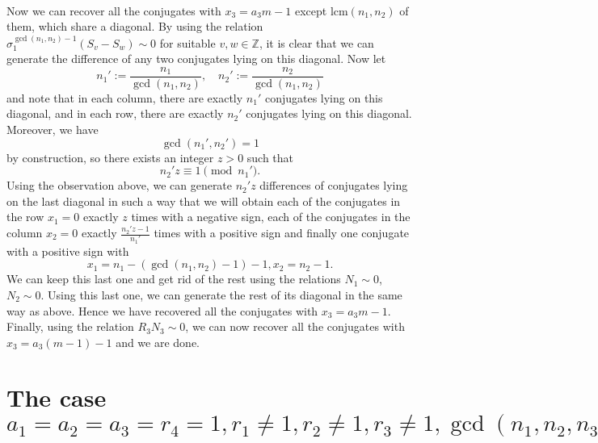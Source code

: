 \documentclass[12pt,a4paper]{article}
\theoremstyle{definition}
\newcommand{\Z}{\mathbb{Z}}
\newcommand{\lcm}{\mathrm{lcm}}
\begin{document}
\paragraph*{}
Now we can recover all the conjugates with $x_3=a_3m-1$ except $\lcm(n_1,n_2)$ of them, which share a diagonal. By using the relation $\sigma_1^{\gcd\left(n_1,n_2\right)-1}\left(S_v-S_w\right)\sim 0$ for suitable $v,w\in\Z$, it is clear that we can generate the difference of any two conjugates lying on this diagonal. Now let $$n_1':=\frac{n_1}{\gcd\left(n_1,n_2\right)}, \quad n_2':=\frac{n_2}{\gcd\left(n_1,n_2\right)}$$ and
note that in each column, there are exactly $n_1'$ conjugates lying on this diagonal, and in each row, there are exactly $n_2'$ conjugates lying on this diagonal. Moreover, we have $$\gcd\left(n_1',n_2'\right)=1$$ by construction,
so there exists an integer $z>0$ such that $$n_2'z\equiv 1\pmod{n_1'}.$$
Using the observation above, we can generate $n_2'z$ differences of conjugates lying on the last diagonal in such a way that we will obtain each of the conjugates in the row $x_1=0$ exactly $z$ times with a negative sign, each of the conjugates in the column $x_2=0$ exactly $\frac{n_2'z-1}{n_1'}$ times with a positive sign and finally one conjugate with a positive sign with $$x_1=n_1-(\gcd\left(n_1,n_2\right)-1)-1,x_2=n_2-1.$$
We can keep this last one and get rid of the rest using the relations $N_1\sim 0$, $N_2\sim 0$. Using this last one, we can generate the rest of its diagonal in the same way as above. Hence we have recovered all the conjugates with $x_3=a_3m-1$. Finally, using the relation $R_3N_3\sim 0$, we can now recover all the conjugates with $x_3=a_3(m-1)-1$ and we are done.


\section{The case $a_1=a_2=a_3=r_4=1, r_1\neq 1, r_2\neq 1, r_3 \neq 1,\gcd(n_1,n_2,n_3)=\gcd(n_1,n_2)$}
\end{document}
